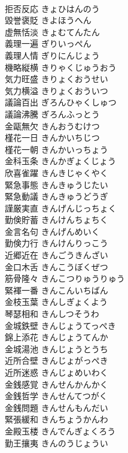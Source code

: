 \documentclass[8pt]{extreport}
\begin{document}
\begin{CJK}{UTF8}{min}
\\	拒否反応	きょひはんのう	
\\	毀誉褒貶	きよほうへん	
\\	虚無恬淡	きょむてんたん	
\\	義理一遍	ぎりいっぺん	
\\	義理人情	ぎりにんじょう	
\\	機略縦横	きりゃくじゅうおう	
\\	気力旺盛	きりょくおうせい	
\\	気力横溢	きりょくおういつ	
\\	議論百出	ぎろんひゃくしゅつ	
\\	議論沸騰	ぎろんふっとう	
\\	金甌無欠	きんおうむけつ	
\\	槿花一日	きんかいちじつ	
\\	槿花一朝	きんかいっちょう	
\\	金科玉条	きんかぎょくじょう	
\\	欣喜雀躍	きんきじゃくやく	
\\	緊急事態	きんきゅうじたい	
\\	緊急動議	きんきゅうどうぎ	
\\	謹厳実直	きんげんじっちょく	
\\	勤倹貯蓄	きんけんちょちく	
\\	金言名句	きんげんめいく	
\\	勤倹力行	きんけんりっこう	
\\	近郷近在	きんごうきんざい	
\\	金口木舌	きんこうぼくぜつ	
\\	筋骨隆々	きんこつりゅうりゅう	
\\	緊褌一番	きんこんいちばん	
\\	金枝玉葉	きんしぎょくよう	
\\	琴瑟相和	きんしつそうわ	
\\	金城鉄壁	きんじょうてっぺき	
\\	錦上添花	きんじょうてんか	
\\	金城湯池	きんじょうとうち	
\\	近所合壁	きんじょがっぺき	
\\	近所迷惑	きんじょめいわく	
\\	金銭感覚	きんせんかんかく	
\\	金銭哲学	きんせんてつがく	
\\	金銭問題	きんせんもんだい	
\\	緊張緩和	きんちょうかんわ	
\\	金殿玉楼	きんでんぎょくろう	
\\	勤王攘夷	きんのうじょうい	

\end{CJK}
\end{document}
